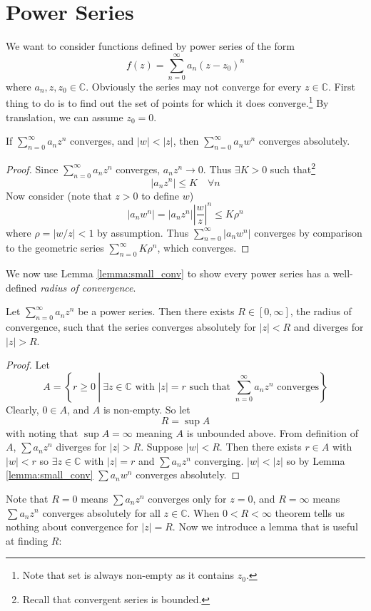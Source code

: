 \documentclass[10pt, a4paper, twoside]{report}
\begin{document}
\section{Power Series}
We want to consider functions defined by power series of the form 
\[f(z)=\sum_{n=0}^{\infty}a_n(z-z_0)^n\]
where \(a_n,z,z_0\in\mathbb{C}\). Obviously the series may not converge for every \(z\in\mathbb{C}\). First thing to do is to find out the set of points for which it does converge.\footnote{Note that set is always non-empty as it contains \(z_0\).} By translation, we can assume \(z_0=0\). 
\begin{lemma}
    If \(\sum_{n=0}^\infty a_nz^n\) converges, and \(|w|<|z|\), then \(\sum_{n=0}^\infty a_nw^n\) converges absolutely.
    \label{lemma:small_conv}
\end{lemma}
\begin{proof}
    Since \(\sum_{n=0}^\infty a_nz^n\) converges, \(a_nz^n\to 0\). Thus \(\exists K>0\) such that\footnote{Recall that convergent series is bounded.} 
    \[|a_nz^n|\leq K\quad\forall n\]
    Now consider (note that \(z>0\) to define \(w\))
    \[|a_nw^n|=|a_nz^n|\left|\frac wz\right|^n\leq K\rho^n\]
    where \(\rho=|w/z|<1\) by assumption. Thus \(\sum_{n=0}^\infty |a_nw^n|\) converges by comparison to the geometric series \(\sum_{n=0}^\infty K\rho^n\), which converges.
\end{proof}
We now use Lemma \ref{lemma:small_conv} to show every power series has a well-defined \emph{radius of convergence}.
\begin{theorem}
    Let \(\sum_{n=0}^\infty a_nz^n\) be a power series. Then there exists \(R\in[0,\infty]\), the radius of convergence, such that the series converges absolutely for \(|z|<R\) and diverges for \(|z|>R\).
\end{theorem}
\begin{proof}
    Let
    \[A=\left\{r\geq 0\:\left|\:\exists z\in\mathbb{C}\text{  with  }|z|=r\text{  such that }\sum_{n=0}^\infty a_nz^n\text{  converges}\right.\right\}\]
    Clearly, \(0\in A\), and \(A\) is non-empty. So let 
\[R=\sup A\]
with noting that \(\sup A=\infty\) meaning \(A\) is unbounded above. From definition of \(A\), \(\sum a_nz^n\) diverges for \(|z|>R\). Suppose \(|w|<R\). Then there exists \(r\in A\) with \(|w|<r\) so \(\exists z\in\mathbb{C}\) with \(|z|=r\) and \(\sum a_nz^n\) converging. \(|w|<|z|\) so by Lemma \ref{lemma:small_conv} \(\sum a_nw^n\) converges absolutely.
\end{proof}
Note that \(R=0\) means \(\sum a_nz^n\) converges only for \(z=0\), and \(R=\infty\) means \(\sum a_nz^n\) converges absolutely for all \(z\in\mathbb{C}\). When \(0<R<\infty\) theorem tells us nothing about convergence for \(|z|=R\). Now we introduce a lemma that is useful at finding \(R\):
\end{document}
